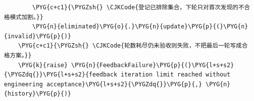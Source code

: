\begin{Verbatim}
        \PYG{c+c1}{\PYGZsh{} \CJKCode{登记已排除集合，下轮只对首次发现的不合格模式加割。}}
        \PYG{n}{eliminated}\PYG{o}{.}\PYG{n}{update}\PYG{p}{(}\PYG{n}{invalid}\PYG{p}{)}
    \PYG{c+c1}{\PYGZsh{} \CJKCode{轮数耗尽仍未验收则失败，不把最后一轮写成合格方案。}}
    \PYG{k}{raise} \PYG{n}{FeedbackFailure}\PYG{p}{(}\PYG{l+s+s2}{\PYGZdq{}}\PYG{l+s+s2}{feedback iteration limit reached without engineering acceptance}\PYG{l+s+s2}{\PYGZdq{}}\PYG{p}{,} \PYG{n}{history}\PYG{p}{)}
\end{Verbatim}
